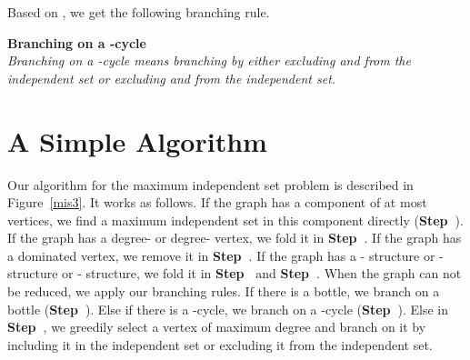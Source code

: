 \documentclass[runningheads]{llncs}
\begin{document}

Based on , we get the following branching rule.

\vspace{2mm}\noindent \textbf{Branching on a -cycle}\\
\emph{Branching on a -cycle  means branching by either
excluding  and  from the independent set or excluding 
and  from the independent set.}


\section{A Simple Algorithm}\label{alg}

Our algorithm for the maximum independent set problem is described
in Figure~\ref{mis3}. It works as follows. If the graph has a
component of at most  vertices, we find a maximum independent
set in this component directly (\textbf{Step~}). If the graph
has a degree- or degree- vertex, we fold it in
\textbf{Step~}. If the graph has a dominated vertex, we remove
it in \textbf{Step~}. If the graph has a - structure or
- structure or - structure, we fold it in
\textbf{Step~} and \textbf{Step~}. When the graph can not be
reduced, we apply our branching rules. If there is a bottle, we
branch on a bottle (\textbf{Step~}). Else if there is a
-cycle, we branch on a -cycle (\textbf{Step~}). Else in
\textbf{Step~}, we greedily select a vertex of maximum degree
and branch on it by including it in the independent set or
excluding it from the independent set.
\end{document}
